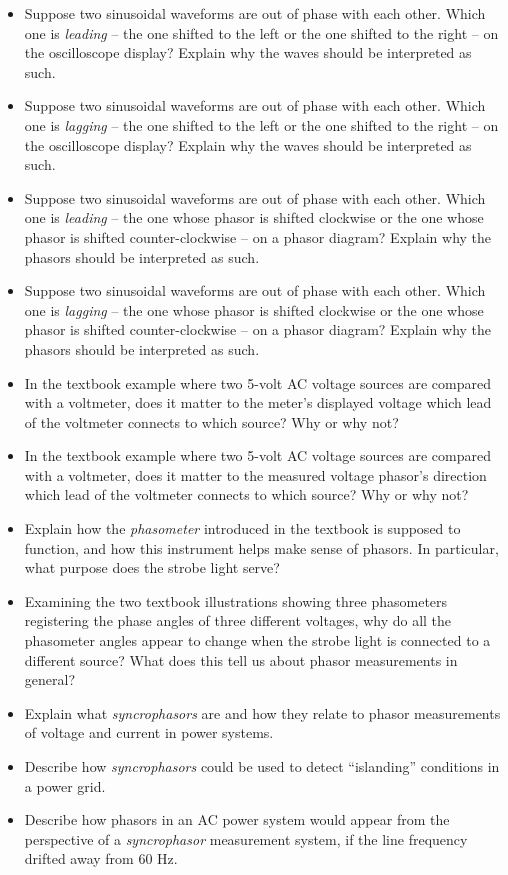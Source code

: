 \begin{itemize}
\item{} Suppose two sinusoidal waveforms are out of phase with each other.  Which one is {\it leading} -- the one shifted to the left or the one shifted to the right -- on the oscilloscope display?  Explain why the waves should be interpreted as such.
\item{} Suppose two sinusoidal waveforms are out of phase with each other.  Which one is {\it lagging} -- the one shifted to the left or the one shifted to the right -- on the oscilloscope display?  Explain why the waves should be interpreted as such.
\item{} Suppose two sinusoidal waveforms are out of phase with each other.  Which one is {\it leading} -- the one whose phasor is shifted clockwise or the one whose phasor is shifted counter-clockwise -- on a phasor diagram?  Explain why the phasors should be interpreted as such.
\item{} Suppose two sinusoidal waveforms are out of phase with each other.  Which one is {\it lagging} -- the one whose phasor is shifted clockwise or the one whose phasor is shifted counter-clockwise -- on a phasor diagram?  Explain why the phasors should be interpreted as such.
\item{} In the textbook example where two 5-volt AC voltage sources are compared with a voltmeter, does it matter to the meter's displayed voltage which lead of the voltmeter connects to which source?  Why or why not?
\item{} In the textbook example where two 5-volt AC voltage sources are compared with a voltmeter, does it matter to the measured voltage phasor's direction which lead of the voltmeter connects to which source?  Why or why not?
\item{} Explain how the {\it phasometer} introduced in the textbook is supposed to function, and how this instrument helps make sense of phasors.  In particular, what purpose does the strobe light serve?
\item{} Examining the two textbook illustrations showing three phasometers registering the phase angles of three different voltages, why do all the phasometer angles appear to change when the strobe light is connected to a different source?  What does this tell us about phasor measurements in general?
\item{} Explain what {\it syncrophasors} are and how they relate to phasor measurements of voltage and current in power systems.
\item{} Describe how {\it syncrophasors} could be used to detect ``islanding'' conditions in a power grid.
\item{} Describe how phasors in an AC power system would appear from the perspective of a {\it syncrophasor} measurement system, if the line frequency drifted away from 60 Hz.
\end{itemize}




